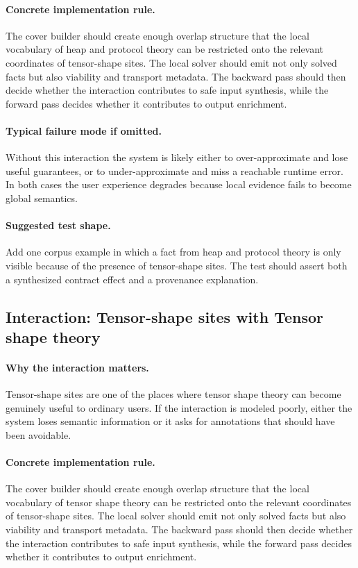 \documentclass[11pt]{report}
\theoremstyle{definition}
\theoremstyle{plain}
\begin{document}
\paragraph{Concrete implementation rule.}
The cover builder should create enough overlap structure that the local
vocabulary of heap and protocol theory can be restricted onto the relevant
coordinates of tensor-shape sites. The local solver should emit not only
solved facts but also viability and transport metadata. The backward pass
should then decide whether the interaction contributes to safe input
synthesis, while the forward pass decides whether it contributes to output
enrichment.

\paragraph{Typical failure mode if omitted.}
Without this interaction the system is likely either to over-approximate and
lose useful guarantees, or to under-approximate and miss a reachable runtime
error. In both cases the user experience degrades because local evidence
fails to become global semantics.

\paragraph{Suggested test shape.}
Add one corpus example in which a fact from heap and protocol theory is only
visible because of the presence of tensor-shape sites. The test should
assert both a synthesized contract effect and a provenance explanation.

\subsection{Interaction: Tensor-shape sites with Tensor shape theory}

\paragraph{Why the interaction matters.}
Tensor-shape sites are one of the places where tensor shape theory can become
genuinely useful to ordinary users. If the interaction is modeled poorly,
either the system loses semantic information or it asks for annotations that
should have been avoidable.

\paragraph{Concrete implementation rule.}
The cover builder should create enough overlap structure that the local
vocabulary of tensor shape theory can be restricted onto the relevant
coordinates of tensor-shape sites. The local solver should emit not only
solved facts but also viability and transport metadata. The backward pass
should then decide whether the interaction contributes to safe input
synthesis, while the forward pass decides whether it contributes to output
enrichment.
\end{document}
